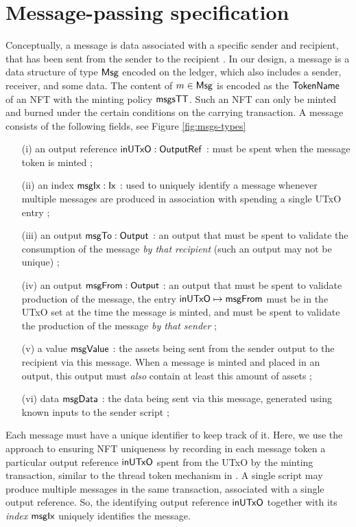 \section{Message-passing specification}
\label{sec:messages}

Conceptually, a message is data associated
with a specific sender and recipient, that has been sent from the sender
to the recipient \cite{distributed}.
In our design, a message is a data structure of type $\mathsf{Msg}$ encoded on
the ledger, which also includes a sender, receiver, and some data.
The content of $m \in \mathsf{Msg}$ is encoded as the $\mathsf{TokenName}$ of an
NFT with the minting policy $\mathsf{msgsTT}$. Such an NFT can only be
minted and burned under the certain conditions on the carrying transaction.
A message consists of the following fields, see Figure \ref{fig:msgs-types}

\begin{itemize}
  \item[(i)] an output reference $\mathsf{inUTxO} : \mathsf{OutputRef}$ : must be
  spent when the message token is minted ;
  \item[(ii)] an index $\mathsf{msgIx} : \mathsf{Ix}$ : used to uniquely identify a message
  whenever multiple messages are produced in association with spending a single UTxO entry ;
  \item[(iii)] an output $\mathsf{msgTo} : \mathsf{Output}$ : an output that must be spent
  to validate the consumption of the message \emph{by that recipient} (such an
  output may not be unique) ;
  \item[(iv)] an output $\mathsf{msgFrom} : \mathsf{Output}$ : an output that must be spent
  to validate production of the message, the entry $\mathsf{inUTxO} \mapsto \mathsf{msgFrom}$
  must be in the UTxO set
  at the time the message is minted, and must be spent to validate the
  production of the message \emph{by that sender} ;
  \item[(v)] a value $\mathsf{msgValue}$ : the assets being sent from the
  sender output to the recipient via this message. When a message is minted
  and placed in an output, this output must \emph{also} contain at least this
  amount of assets ;
  \item[(vi)] data $\mathsf{msgData}$ : the data being sent via this message, generated
  using known inputs to the sender script ;
\end{itemize}

Each message must have a unique identifier to keep track of it.
Here, we use the approach to ensuring NFT uniqueness by recording in each message
token a particular output reference $\mathsf{inUTxO}$ spent from the UTxO by the minting transaction,
similar to the thread token mechanism in
\cite{eutxoma} \cite{structured}. A single script may produce multiple messages
in the same transaction, associated with a single output reference.
So, the identifying output reference $\mathsf{inUTxO}$ together with its \emph{index} $\mathsf{msgIx}$
uniquely identifies the message.

